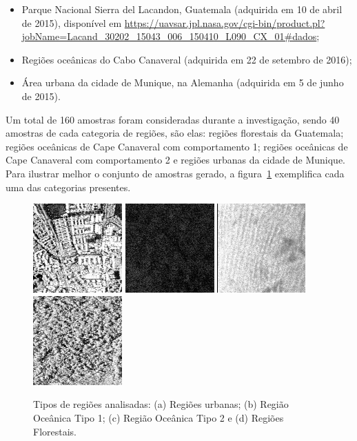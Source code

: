 \documentclass[12pt]{article}
\begin{document}
\begin{itemize}
    \item Parque Nacional Sierra del Lacandon, Guatemala (adquirida em 10 de abril de 2015), disponível em \url{https://uavsar.jpl.nasa.gov/cgi-bin/product.pl?jobName=Lacand_30202_15043_006_150410_L090_CX_01#dados};
    \item Regiões oceânicas do Cabo Canaveral (adquirida em 22 de setembro de 2016);
    \item Área urbana da cidade de Munique, na Alemanha (adquirida em 5 de junho de 2015).
\end{itemize}

Um total de 160 amostras foram consideradas durante a investigação, sendo 40 amostras de cada categoria de regiões, são elas: regiões florestais da Guatemala; regiões oceânicas de Cape Canaveral com comportamento 1; regiões oceânicas de Cape Canaveral com comportamento 2 e regiões urbanas da cidade de Munique. Para ilustrar melhor o conjunto de amostras gerado, a figura~\ref{fig:RegioesSAR} exemplifica cada uma das categorias presentes.

\begin{figure}[!h]
\centering
\includegraphics[width=.23\linewidth]{Figures/munichUrban.png}
\includegraphics[width=.23\linewidth]{Figures/Cape1.png}
\includegraphics[width=.23\linewidth]{Figures/Cape2.png}
\includegraphics[width=.23\linewidth]{Figures/guatemalaflorest.png}
\caption{Tipos de regiões analisadas: (a) Regiões urbanas; (b) Região Oceânica Tipo 1; (c) Região Oceânica Tipo 2 e (d) Regiões Florestais.}\label{fig:RegioesSAR}
\end{figure} 
\end{document}
